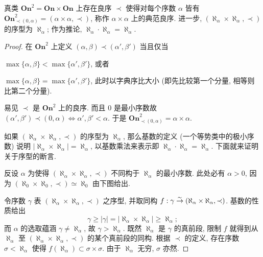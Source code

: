 \begin{theorem}\label{prop:Ord2-canonical}
	真类 $\textbf{On}^2 = \textbf{On} \times \textbf{On}$ 上存在良序 $\prec$ 使得对每个序数 $\alpha$ 皆有 $\textbf{On}^2_{\prec (0, \alpha)} = (\alpha \times \alpha, \prec)$, 称作 $\alpha \times \alpha$ 上的典范良序. 进一步, $(\aleph_\alpha \times \aleph_\alpha, \prec)$ 的序型为 $\aleph_\alpha$; 作为推论, $\aleph_\alpha \cdot \aleph_\alpha = \aleph_\alpha$.
\end{theorem}
\begin{proof}
	在 $\textbf{On}^2$ 上定义 $(\alpha, \beta) \prec (\alpha', \beta')$ 当且仅当
	\begin{compactitem}
		\item $\max\{\alpha, \beta\} < \max\{\alpha', \beta'\}$, 或者
		\item $\max\{\alpha, \beta\} = \max\{\alpha', \beta'\}$, 此时以字典序比大小 (即先比较第一个分量, 相等则比第二个分量).
	\end{compactitem}
	易见 $\prec$ 是 $\textbf{On}^2$ 上的良序. 而且 $0$ 是最小序数故 $(\alpha', \beta') \prec (0, \alpha) \iff \alpha', \beta' < \alpha$. 于是 $\textbf{On}^2_{\prec (0, \alpha)} = \alpha \times \alpha$.
	
	如果 $(\aleph_\alpha \times \aleph_\alpha, \prec)$ 的序型为 $\aleph_\alpha$, 那么基数的定义 (一个等势类中的极小序数) 说明 $|\aleph_\alpha \times \aleph_\alpha| = \aleph_\alpha$, 以基数乘法来表示即 $\aleph_\alpha \cdot \aleph_\alpha = \aleph_\alpha$. 下面就来证明关于序型的断言.

	反设 $\alpha$ 为使得 $(\aleph_\alpha \times \aleph_\alpha, \prec)$ 不同构于 $\aleph_\alpha$ 的最小序数. 此处必有 $\alpha > 0$, 因为 $(\aleph_0 \times \aleph_0, \prec) \simeq \aleph_0$ 由下图给出.
	\begin{center} \qquad {}\end{center}
	令序数 $\gamma$ 表 $(\aleph_\alpha \times \aleph_\alpha, \prec)$ 之序型, 并取同构 $f: \gamma \stackrel{\sim}{\rightarrow} (\aleph_\alpha \times \aleph_\alpha, \prec)$. 基数的性质给出
	\[ \gamma \geq |\gamma| = |\aleph_\alpha \times \aleph_\alpha| \geq \aleph_\alpha; \]
	而 $\alpha$ 的选取蕴涵 $\gamma \neq \aleph_\alpha$, 故 $\gamma > \aleph_\alpha$. 既然 $\aleph_\alpha$ 是 $\gamma$ 的真前段, 限制 $f$ 就得到从 $\aleph_\alpha$ 至 $(\aleph_\alpha \times \aleph_\alpha, \prec)$ 的某个真前段的同构. 根据 $\prec$ 的定义, 存在序数 $\sigma < \aleph_\alpha$ 使得 $f(\aleph_\alpha) \subset \sigma \times \sigma$. 由于 $\aleph_\alpha$ 无穷, $\sigma$ 亦然.
	

\end{proof}
